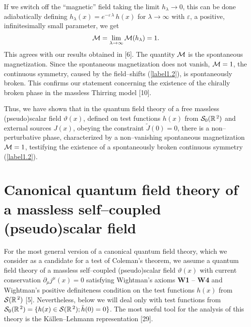\documentclass[a4paper,12pt] {article}
\begin{document}
If we switch off the ``magnetic'' field taking the limit $h_{\lambda}
\to 0$, this can be done adiabatically defining $h_{\lambda}(x) =
e^{\textstyle -\varepsilon\,\lambda}\,h(x)$ for $\lambda \to \infty$
with $\varepsilon$, a positive, infinitesimally small parameter, we
get
%
\begin{eqnarray}\label{label3.13}
{\cal M} = \lim_{\lambda \to \infty}{\cal M}(h_{\lambda}) = 1.
\end{eqnarray}
%
This agrees with our results obtained in [6]. The quantity ${\cal M}$
is the spontaneous magnetization. Since the spontaneous magnetization
does not vanish, ${\cal M} = 1$, the continuous symmetry, caused by the
field--shifts (\ref{label1.2}), is spontaneously broken. This confirms
our statement concerning the existence of the chirally broken phase in
the massless Thirring model [10].

Thus, we have shown that in the quantum field theory of a free
massless (pseudo)scalar field $\vartheta(x)$, defined on test
functions $h(x)$ from ${\cal S}_0(\mathbb{R}^{\,2})$ and external
sources $J(x)$, obeying the constraint $\tilde{J}(0) = 0$, there is a
non--perturbative phase, characterized by a non--vanishing spontaneous
magnetization ${\cal M} = 1$, testifying the existence of a
spontaneously broken continuous symmetry (\ref{label1.2}). 

\section{Canonical quantum field theory of a massless 
self--coupled (pseudo)scalar field} 
\setcounter{equation}{0}

\hspace{0.2in} For the most general version of a canonical quantum
field theory, which we consider as a candidate for a test of Coleman's
theorem, we assume a quantum field theory of a massless self--coupled
(pseudo)scalar field $\vartheta(x)$ with current conservation
$\partial_{\mu}j^{\mu}(x) = 0$ satisfying Wightman's axioms {\bf W1}
-- {\bf W4} and Wightman's positive definiteness condition on the test
functions $h(x)$ from ${\cal S}(\mathbb{R}^{\,2})$ [5]. Nevertheless,
below we will deal only with test functions from ${\cal
S}_0(\mathbb{R}^{\,2}) = \{h(x) \in {\cal S}(\mathbb{R}^{\,2});
\tilde{h}(0) = 0\}$. The most useful tool for the analysis of this
theory is the K\"allen--Lehmann representation [29].
\end{document}
